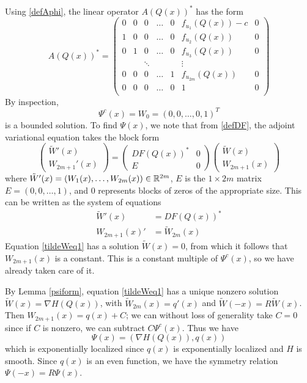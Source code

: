 \documentclass[thesis.tex]{subfiles}
\begin{document}
Using \eqref{defAphi}, the linear operator $A(Q(x))^*$ has the form 
\begin{equation}\label{defAphi}
A(Q(x))^* = 
\begin{pmatrix}
0 & 0 & 0 & \dots & 0 & f_{u_1}(Q(x)) - c & 0 \\
1 & 0 & 0 & \dots & 0 & f_{u_2}(Q(x)) & 0 \\
0 & 1 & 0 & \dots & 0 & f_{u_3}(Q(x)) & 0 \\
&& \ddots &&& \vdots \\
0 & 0 & 0 & \dots & 1 & f_{u_{2m}}(Q(x)) & 0 \\
0 & 0 & 0 & \dots & 0 & 1 & 0 \\
\end{pmatrix}
\end{equation}
By inspection, 
\[
\Psi^c(x) = W_0 = (0, 0, \dots, 0, 1)^T
\]
is a bounded solution. To find $\Psi(x)$, we note that from \eqref{defDF}, the adjoint variational equation takes the block form
\[
\begin{pmatrix} \tilde{W}'(x) \\ W_{2m+1}'(x) \end{pmatrix}
= 
\begin{pmatrix}DF(Q(x))^* & 0 \\ E & 0 \end{pmatrix}\begin{pmatrix} \tilde{W}(x) \\ W_{2m+1}(x) \end{pmatrix}
\]
where $\tilde{W}'(x) = (W_1(x), \dots, W_{2m}(x)) \in \mathbb{R}^{2m}$, $E$ is the $1 \times 2m$ matrix $E = (0, 0, \dots, 1)$, and $0$ represents blocks of zeros of the appropriate size. This can be written as the system of equations
\begin{align}
\tilde{W}'(x) &= DF(Q(x))^* \label{tildeWeq1} \\
W_{2m+1}(x)' &= \tilde{W}_{2m}(x) \label{tildeWeq2}
\end{align}
Equation \eqref{tildeWeq1} has a solution $\tilde{W}(x) = 0$, from which it follows that $W_{2m+1}(x)$ is a constant. This is a constant multiple of $\Psi^c(x)$, so we have already taken care of it.

By Lemma \ref{psiform}, equation \eqref{tildeWeq1} has a unique nonzero solution $\tilde{W}(x) = \nabla H(Q(x))$, with $\tilde{W}_{2m}(x)=q'(x)$ and $\tilde{W}(-x) = R\tilde{W}(x)$. Then $W_{2m+1}(x) = q(x) + C$; we can without loss of generality take $C = 0$ since if $C$ is nonzero, we can subtract $C \Psi^c(x)$. Thus we have
\[
\Psi(x) = ( \nabla H(Q(x)), q(x) )
\]
which is exponentially localized since $q(x)$ is exponentially localized and $H$ is smooth. Since $q(x)$ is an even function, we have the symmetry relation $\Psi(-x) = R \Psi(x)$.
\end{document}

